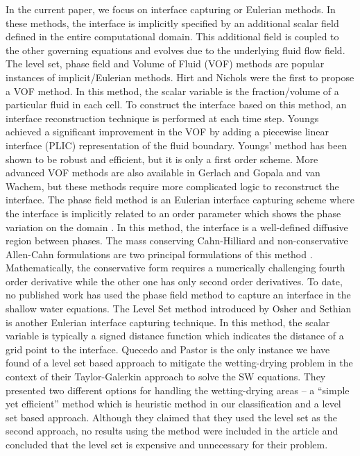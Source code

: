 \documentclass[review]{elsarticle}
\begin{document}
In the current paper, we focus  on interface capturing or Eulerian methods. In these methods, the interface is implicitly  specified by an additional scalar field  defined in the entire 
computational domain. This additional field is coupled to the other governing equations and evolves due to the underlying fluid flow field.
The level set, phase field and Volume of Fluid (VOF) methods are  popular instances of implicit/Eulerian methods.
Hirt and Nichols \cite{hirt1981vfv} were the first to propose a VOF method. 
In this method, the scalar variable is the fraction/volume of a particular fluid in each cell.
To construct the interface based on this method, an interface  reconstruction technique is performed at each time step. 
Youngs \cite{youngs1982tdm} achieved a significant improvement 
in the VOF by adding a piecewise linear interface   (PLIC) representation of the fluid boundary. 
Youngs' method has been shown to be robust and efficient, but it is only a first order scheme. 
More advanced VOF methods are also available in Gerlach \cite{gerlach2006cvf} and Gopala and van Wachem\cite{gopala2008vfm}, but these methods require more complicated logic to 
reconstruct the interface.
The phase field method is an Eulerian interface capturing scheme where the interface is implicitly related to an order parameter which shows the phase variation on the domain \cite{Anderson1998}. 
In this method, the interface is a well-defined diffusive region between phases. 
The mass conserving Cahn-Hilliard and non-conservative Allen-Cahn formulations are two principal formulations of this method \cite{CahnHilliard1958i,CahnHilliard1958ii,Yang2006}. %
 Mathematically, the conservative form requires a numerically challenging fourth order derivative while the other one has only second order derivatives. 
To date, no published work has used the phase field method to capture an interface in the shallow water equations.
The Level Set method introduced by Osher and Sethian  \cite{Osher1988} is another Eulerian interface capturing technique.  In this method, the scalar variable is typically 
a signed distance function which indicates the distance of a grid point to the interface. 
Quecedo and Pastor \cite{quecedo2002rtg} is the only instance we have found of a level set based approach to mitigate the wetting-drying problem in the context of their 
 Taylor-Galerkin approach to solve the SW equations. They presented two 
different options for handling the wetting-drying areas -- a ``simple yet efficient'' method which is  heuristic method in our classification and a level set based approach. 
Although they claimed that they used the level set as the second approach, no results using the method were included in the article and
 concluded  that the level set is expensive and unnecessary for their problem.
\end{document}

